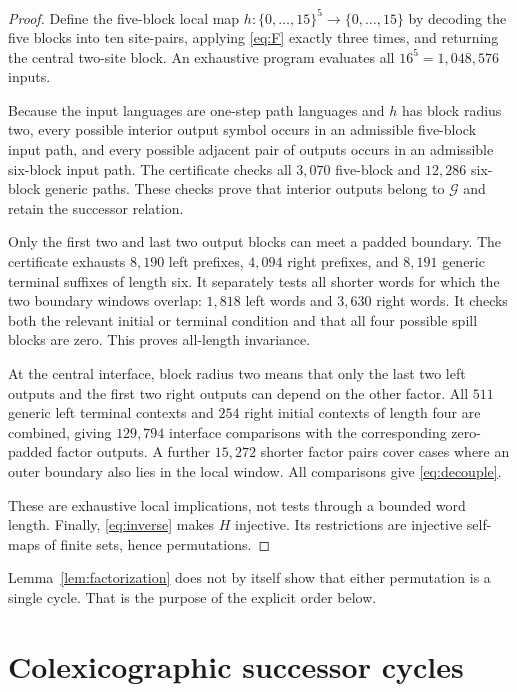 \documentclass[11pt]{article}
\theoremstyle{remark}
\newcommand{\GenericSet}{\mathcal G}
\begin{document}
\begin{proof}
Define the five-block local map $h:\{0,\ldots,15\}^5\to
\{0,\ldots,15\}$ by decoding the five blocks into ten site-pairs,
applying \eqref{eq:F} exactly three times, and returning the central two-site
block.  An exhaustive program evaluates all $16^5=1{,}048{,}576$ inputs.

Because the input languages are one-step path languages and $h$ has block
radius two, every possible interior output symbol occurs in an admissible
five-block input path, and every possible adjacent pair of outputs occurs in
an admissible six-block input path.  The certificate checks all $3{,}070$
five-block and $12{,}286$ six-block generic paths.  These checks prove that
interior outputs belong to $\GenericSet$ and retain the successor relation.

Only the first two and last two output blocks can meet a padded boundary.  The
certificate exhausts $8{,}190$ left prefixes, $4{,}094$ right prefixes, and
$8{,}191$ generic terminal suffixes of length six.  It separately tests all
shorter words for which the two boundary windows overlap: $1{,}818$ left
words and $3{,}630$ right words.  It checks both the relevant initial or
terminal condition and that all four possible spill blocks are zero.  This
proves all-length invariance.

At the central interface, block radius two means that only the last two left
outputs and the first two right outputs can depend on the other factor.  All
$511$ generic left terminal contexts and $254$ right initial contexts of
length four are combined, giving $129{,}794$ interface comparisons with the
corresponding zero-padded factor outputs.  A further $15{,}272$ shorter factor
pairs cover cases where an outer boundary also lies in the local window.  All
comparisons give \eqref{eq:decouple}.

These are exhaustive local implications, not tests through a bounded word
length.  Finally, \eqref{eq:inverse} makes $H$ injective.  Its restrictions are
injective self-maps of finite sets, hence permutations.
\end{proof}

Lemma~\ref{lem:factorization} does not by itself show that either permutation
is a single cycle.  That is the purpose of the explicit order below.

\section{Colexicographic successor cycles}
\end{document}
